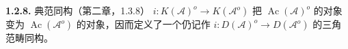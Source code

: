\medskip\noindent\textbf{1.2.8.}\quad
典范同构（第二章，1.3.8）
$i\colon K(\mathcal A)^o\longrightarrow K(\mathcal A^o)$ 把
$\operatorname{Ac}(\mathcal A)^o$ 的对象变为
$\operatorname{Ac}(\mathcal A^o)$ 的对象，因而定义了一个仍记作
$i\colon D(\mathcal A)^o\longrightarrow D(\mathcal A^o)$ 的三角范畴同构。
\endgroup
